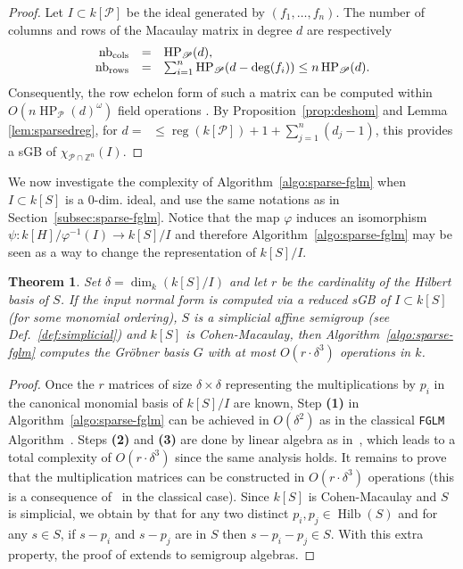 \documentclass[12pt]{article}
\numberwithin{equation}{section}
\newtheorem{theorem}{Theorem}
\numberwithin{theorem}{section}
\newcommand{\Z}{\mathbb{Z}}
\DeclareMathOperator{\HP}{HP}
\DeclareMathOperator{\hilbert}{Hilb}
\newcommand{\sgp}{S}
\newcommand{\polytope}{\mathscr P}
\DeclareMathOperator{\reg}{reg}
\DeclareMathOperator{\dwit}{d_{wit}}
\newcommand{\degreeI}{\delta}
\begin{document}
\begin{proof}
Let $I\subset k[\polytope]$ be the ideal generated by $(
f_1,\ldots,f_n)$.  The number of columns and
rows of the Macaulay matrix in degree $d$ are respectively
$$\begin{array}{rcl}
{\rm nb_{cols}}&=&\HP_\polytope(d),\\
{\rm nb_{rows}}&=&\sum_{i=1}^{n}\HP_\polytope(d-\deg(f_i))\leq n\HP_\polytope(d).
\end{array}$$
Consequently, the row echelon form of such a matrix can be computed within $O(n\HP_\polytope(d)^\omega)$ field operations \cite[Prop. 2.11]{storjohann2000algorithms}. By Proposition~\ref{prop:deshom} and Lemma \ref{lem:sparsedreg}, for $d=\dwit\leq \reg(k[\polytope])+1+\sum_{j=1}^n(d_j-1)$, this provides a sGB of $\chi_{\polytope\cap\Z^n}(I)$.
\end{proof}

We now investigate the complexity of Algorithm~\ref{algo:sparse-fglm}
when $I\subset k[\sgp]$ is a $0$-dim. ideal, and use the same
notations as in Section~\ref{subsec:sparse-fglm}.  Notice that the map
$\varphi$ induces an isomorphism $\psi: k[H]/\varphi^{-1}(I)
\rightarrow k[\sgp]/I$ and therefore Algorithm~\ref{algo:sparse-fglm}
may be seen as a way to change the representation of $k[\sgp]/I$.


\begin{theorem}\label{theo:complFGLM}
Set $\degreeI=\dim_k(k[\sgp]/I)$
 and let $r$ be the cardinality of the Hilbert basis of $\sgp$.
If the input normal form is computed via a reduced sGB of $I\subset k[\sgp]$ (for some monomial ordering), $\sgp$ is a simplicial affine semigroup (see Def.~\ref{def:simplicial}) and $k[\sgp]$ is Cohen-Macaulay, then Algorithm~\ref{algo:sparse-fglm} computes the Gr\"obner basis $G$ with at most $O(r\cdot \degreeI^3)$ operations in $k$.
\end{theorem}
\begin{proof}
Once the $r$ matrices of size $\delta\times\delta$ representing the multiplications by $p_i$ in the canonical monomial basis of $k[S]/I$ are known, Step {\bf{(1)}} in Algorithm~\ref{algo:sparse-fglm} can be achieved in $O(\degreeI^2)$ as in the classical {\tt FGLM} Algorithm~\cite{FGLM}. Steps {\bf{(2)}} and {\bf{(3)}} are done by linear algebra as in~\cite{FGLM}, which leads to a total complexity of $O(r\cdot \degreeI^3)$ since the same analysis holds. It remains to prove that the multiplication matrices can be constructed in $O(r\cdot \degreeI^3)$ operations (this is a consequence of~\cite[Prop.~2.1]{FGLM} in the classical case).  Since $k[\sgp]$ is Cohen-Macaulay and $\sgp$ is simplicial,  we obtain by \cite[Thm.~1.1]{rosales1998cohen} that for any two distinct $p_i,p_j\in \hilbert(\sgp)$ and for any $s\in\sgp$, if $s-p_i$ and $s-p_j$ are in $\sgp$ then $s-p_i-p_j\in\sgp$. With this extra property, the proof of \cite[Prop.~2.1]{FGLM} extends to semigroup algebras. 
\end{proof}
\end{document}
